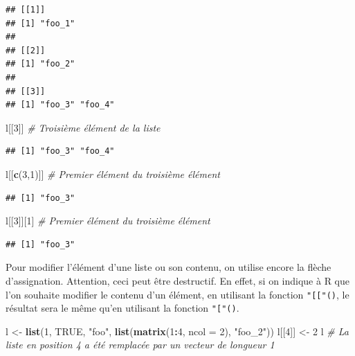 \documentclass[
  11pt,
]{book}
\newenvironment{Shaded}{\begin{snugshade}}{\end{snugshade}}
\newcommand{\CommentTok}[1]{\textcolor[rgb]{0.56,0.35,0.01}{\textit{#1}}}
\newcommand{\DataTypeTok}[1]{\textcolor[rgb]{0.13,0.29,0.53}{#1}}
\newcommand{\DecValTok}[1]{\textcolor[rgb]{0.00,0.00,0.81}{#1}}
\newcommand{\KeywordTok}[1]{\textcolor[rgb]{0.13,0.29,0.53}{\textbf{#1}}}
\newcommand{\NormalTok}[1]{#1}
\newcommand{\OperatorTok}[1]{\textcolor[rgb]{0.81,0.36,0.00}{\textbf{#1}}}
\newcommand{\OtherTok}[1]{\textcolor[rgb]{0.56,0.35,0.01}{#1}}
\newcommand{\StringTok}[1]{\textcolor[rgb]{0.31,0.60,0.02}{#1}}
\numberwithin{equation}{section}
\numberwithin{countremarque}{section}
\begin{document}
\begin{lstlisting}
## [[1]]
## [1] "foo_1"
## 
## [[2]]
## [1] "foo_2"
## 
## [[3]]
## [1] "foo_3" "foo_4"
\end{lstlisting}

\begin{Shaded}
\begin{Highlighting}[]
\NormalTok{l[[}\DecValTok{3}\NormalTok{]]  }\CommentTok{\# Troisième élément de la liste}
\end{Highlighting}
\end{Shaded}

\begin{lstlisting}
## [1] "foo_3" "foo_4"
\end{lstlisting}

\begin{Shaded}
\begin{Highlighting}[]
\NormalTok{l[[}\KeywordTok{c}\NormalTok{(}\DecValTok{3}\NormalTok{,}\DecValTok{1}\NormalTok{)]] }\CommentTok{\# Premier élément du troisième élément}
\end{Highlighting}
\end{Shaded}

\begin{lstlisting}
## [1] "foo_3"
\end{lstlisting}

\begin{Shaded}
\begin{Highlighting}[]
\NormalTok{l[[}\DecValTok{3}\NormalTok{]][}\DecValTok{1}\NormalTok{]   }\CommentTok{\# Premier élément du troisième élément}
\end{Highlighting}
\end{Shaded}

\begin{lstlisting}
## [1] "foo_3"
\end{lstlisting}

Pour modifier l'élément d'une liste ou son contenu, on utilise encore la flèche d'assignation. Attention, ceci peut être destructif. En effet, si on indique à R que l'on souhaite modifier le contenu d'un élément, en utilisant la fonction \texttt{"{[}{[}"()}, le résultat sera le même qu'en utilisant la fonction \texttt{"{[}"()}.

\begin{Shaded}
\begin{Highlighting}[]
\NormalTok{l \textless{}{-}}\StringTok{ }\KeywordTok{list}\NormalTok{(}\DecValTok{1}\NormalTok{, }\OtherTok{TRUE}\NormalTok{, }\StringTok{"foo"}\NormalTok{, }\KeywordTok{list}\NormalTok{(}\KeywordTok{matrix}\NormalTok{(}\DecValTok{1}\OperatorTok{:}\DecValTok{4}\NormalTok{, }\DataTypeTok{ncol =} \DecValTok{2}\NormalTok{), }\StringTok{"foo\_2"}\NormalTok{))}
\NormalTok{l[[}\DecValTok{4}\NormalTok{]] \textless{}{-}}\StringTok{ }\DecValTok{2}
\NormalTok{l  }\CommentTok{\# La liste en position 4 a été remplacée par un vecteur de longueur 1}
\end{Highlighting}
\end{Shaded}
\end{document}
